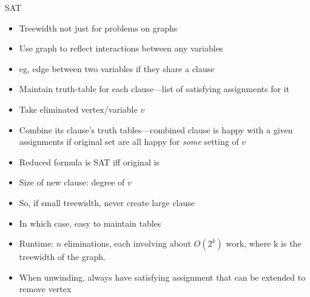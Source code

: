 \documentclass{article}
\begin{document}
SAT
\begin{itemize}
\item Treewidth not just for problems on graphs
\item Use graph to reflect interactions between any variables
\item eg, edge between two variables if they share a clause
\item Maintain truth-table for each clause---list of satisfying
  assignments for it
\item Take eliminated vertex/variable $v$
\item Combine its clause's truth tables---combined clause is happy
  with a given assignments if original set are all happy for
  \emph{some} setting of $v$
\item Reduced formula is SAT iff original is
\item Size of new clause: degree of $v$
\item So, if small treewidth, never create large clause
\item In which case, easy to maintain tables
\item Runtime: $n$ eliminations, each involving about $O(2^k)$ work, where k is the treewidth of the graph.
\item When unwinding, always have satisfying assignment that can be
  extended to remove vertex
\end{itemize}
\end{document}
